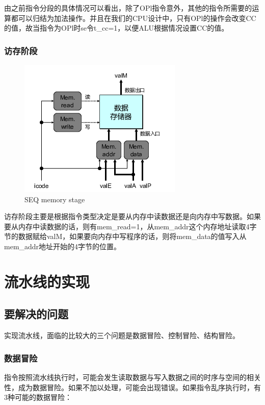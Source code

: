 由之前指令分段的具体情况可以看出，除了OPl指令意外，其他的指令所需要的运算都可以归结为加法操作。并且在我们的CPU设计中，只有OPl的操作会改变CC的值，故当指令为OPl时se令t\_cc=1，以便ALU根据情况设置CC的值。

\subsubsection{访存阶段}\label{ux8bbfux5b58ux9636ux6bb5}

\begin{figure}[htbp]
\centering
\includegraphics{img/seq-memory.png}
\caption{SEQ memory stage}
\end{figure}

访存阶段主要是根据指令类型决定是要从内存中读数据还是向内存中写数据。如果要从内存中读数据的话，则有mem\_read=1，从mem\_addr这个内存地址读取4字节的数据赋给valM，如果要向内存中写程序的话，则将mem\_data的值写入从mem\_addr地址开始的4字节的位置。

\section{流水线的实现}\label{ux6d41ux6c34ux7ebfux7684ux5b9eux73b0}

\subsection{要解决的问题}\label{ux8981ux89e3ux51b3ux7684ux95eeux9898}

实现流水线，面临的比较大的三个问题是数据冒险、控制冒险、结构冒险。

\subsubsection{数据冒险}\label{ux6570ux636eux5192ux9669}

指令按照流水线执行时，可能会发生读取数据与写入数据之间的时序与空间的相关性，成为数据冒险。如果不加以处理，可能会出现错误。如果指令乱序执行时，有3种可能的数据冒险：

